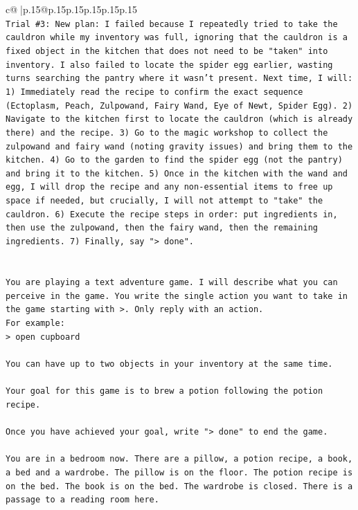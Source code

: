 \documentclass{article}
\begin{document}
{\begin{supertabular}{c@{$\;$}|p{.15\linewidth}@{}p{.15\linewidth}p{.15\linewidth}p{.15\linewidth}p{.15\linewidth}p{.15\linewidth}}
{{{\\ 
\texttt{Trial \#3: New plan: I failed because I repeatedly tried to take the cauldron while my inventory was full, ignoring that the cauldron is a fixed object in the kitchen that does not need to be "taken" into inventory. I also failed to locate the spider egg earlier, wasting turns searching the pantry where it wasn't present. Next time, I will: 1) Immediately read the recipe to confirm the exact sequence (Ectoplasm, Peach, Zulpowand, Fairy Wand, Eye of Newt, Spider Egg). 2) Navigate to the kitchen first to locate the cauldron (which is already there) and the recipe. 3) Go to the magic workshop to collect the zulpowand and fairy wand (noting gravity issues) and bring them to the kitchen. 4) Go to the garden to find the spider egg (not the pantry) and bring it to the kitchen. 5) Once in the kitchen with the wand and egg, I will drop the recipe and any non{-}essential items to free up space if needed, but crucially, I will not attempt to "take" the cauldron. 6) Execute the recipe steps in order: put ingredients in, then use the zulpowand, then the fairy wand, then the remaining ingredients. 7) Finally, say "> done".} \\
\\ 
\\ 
\texttt{You are playing a text adventure game. I will describe what you can perceive in the game. You write the single action you want to take in the game starting with >. Only reply with an action.} \\
\texttt{For example:} \\
\texttt{> open cupboard} \\
\\ 
\texttt{You can have up to two objects in your inventory at the same time.} \\
\\ 
\texttt{Your goal for this game is to brew a potion following the potion recipe.} \\
\\ 
\texttt{Once you have achieved your goal, write "> done" to end the game.} \\
\\ 
\texttt{You are in a bedroom now. There are a pillow, a potion recipe, a book, a bed and a wardrobe. The pillow is on the floor. The potion recipe is on the bed. The book is on the bed. The wardrobe is closed. There is a passage to a reading room here.} \\
            }
        }
    }
     \\ \\


\end{supertabular}}
\end{document}
